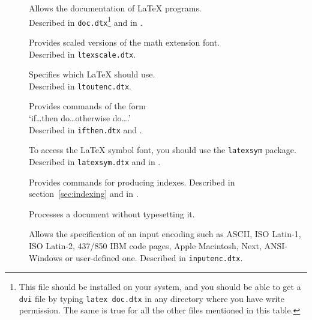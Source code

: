 \begin{table}[btp]
\caption{Some of the Packages Distributed with \LaTeX.} \label{packages}
\begin{lined}{11cm}
\begin{description}
\item[\normalfont{}] Allows the documentation of \LaTeX{} programs.\\
 Described in \texttt{doc.dtx}\footnote{This file should be installed
   on your system, and you should be able to get a \texttt{dvi} file
   by typing \texttt{latex doc.dtx} in any directory where you have
   write permission. The same is true for all the
   other files mentioned in this table.}  and in \companion.

\item[\normalfont{}] Provides scaled versions of the
  math extension  font.\\ 
  Described in \texttt{ltexscale.dtx}.

\item[\normalfont{}] Specifies which 
  \LaTeX{} should use.\\
  Described in \texttt{ltoutenc.dtx}.

\item[\normalfont{}] Provides commands of the form\\ 
  `if\ldots then do\ldots otherwise do\ldots.'\\ Described in
  \texttt{ifthen.dtx} and \companion.

\item[\normalfont{}] To access the \LaTeX{} symbol
  font, you should use the \texttt{latexsym} package. Described in
  \texttt{latexsym.dtx} and in \companion.
 
\item[\normalfont{}] Provides commands for producing
  indexes.  Described in section~\ref{sec:indexing} and in \companion.

\item[\normalfont{}] Processes a document without
  typesetting it.
  
\item[\normalfont{}] Allows the specification of an
  input encoding such as ASCII, ISO Latin-1, ISO Latin-2, 437/850 IBM
  code pages,  Apple Macintosh, Next, ANSI-Windows or user-defined one.
  Described in \texttt{inputenc.dtx}. 
\end{description}
\end{lined}
\end{table}


